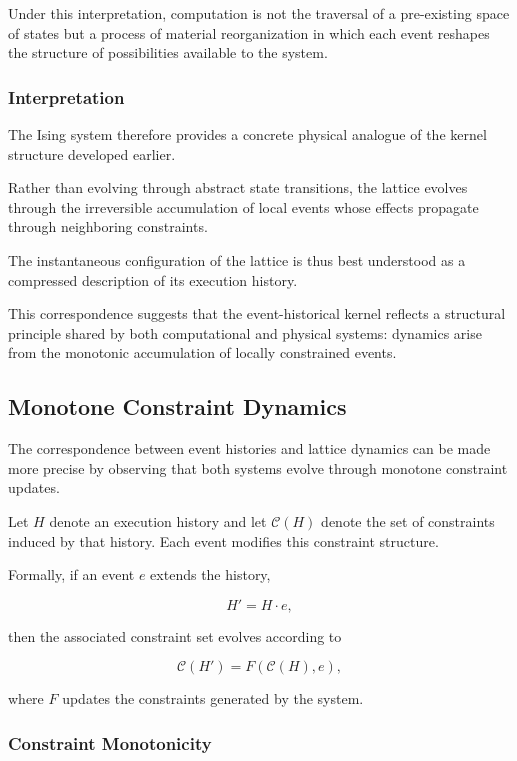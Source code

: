 \documentclass[12pt]{article}
\begin{document}
Under this interpretation, computation is not the traversal
of a pre-existing space of states but a process of
material reorganization in which each event reshapes the
structure of possibilities available to the system.

\subsubsection{Interpretation}

The Ising system therefore provides a concrete physical
analogue of the kernel structure developed earlier.

Rather than evolving through abstract state transitions,
the lattice evolves through the irreversible accumulation
of local events whose effects propagate through neighboring
constraints.

The instantaneous configuration of the lattice is thus
best understood as a compressed description of its
execution history.

This correspondence suggests that the event-historical
kernel reflects a structural principle shared by both
computational and physical systems: dynamics arise from
the monotonic accumulation of locally constrained events.

\subsection{Monotone Constraint Dynamics}

The correspondence between event histories and lattice dynamics
can be made more precise by observing that both systems evolve
through monotone constraint updates.

Let $H$ denote an execution history and let $\mathcal{C}(H)$
denote the set of constraints induced by that history.
Each event modifies this constraint structure.

Formally, if an event $e$ extends the history,

\[
H' = H \cdot e ,
\]

then the associated constraint set evolves according to

\[
\mathcal{C}(H') = F(\mathcal{C}(H), e),
\]

where $F$ updates the constraints generated by the system.

\subsubsection{Constraint Monotonicity}
\end{document}
